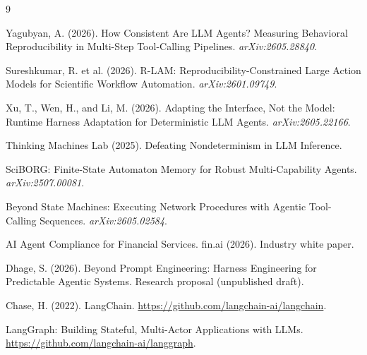\documentclass[11pt]{article}
\begin{document}

\begin{thebibliography}{9}

 Yagubyan, A. (2026). How Consistent Are LLM Agents? Measuring Behavioral Reproducibility in Multi-Step Tool-Calling Pipelines. \emph{arXiv:2605.28840}.

 Sureshkumar, R. et al. (2026). R-LAM: Reproducibility-Constrained Large Action Models for Scientific Workflow Automation. \emph{arXiv:2601.09749}.

 Xu, T., Wen, H., and Li, M. (2026). Adapting the Interface, Not the Model: Runtime Harness Adaptation for Deterministic LLM Agents. \emph{arXiv:2605.22166}.

 Thinking Machines Lab (2025). Defeating Nondeterminism in LLM Inference.

 SciBORG: Finite-State Automaton Memory for Robust Multi-Capability Agents. \emph{arXiv:2507.00081}.

 Beyond State Machines: Executing Network Procedures with Agentic Tool-Calling Sequences. \emph{arXiv:2605.02584}.

 AI Agent Compliance for Financial Services. fin.ai (2026). Industry white paper.

 Dhage, S. (2026). Beyond Prompt Engineering: Harness Engineering for Predictable Agentic Systems. Research proposal (unpublished draft).

 Chase, H. (2022). LangChain. \url{https://github.com/langchain-ai/langchain}.

 LangGraph: Building Stateful, Multi-Actor Applications with LLMs. \url{https://github.com/langchain-ai/langgraph}.

\end{thebibliography}
\end{document}

